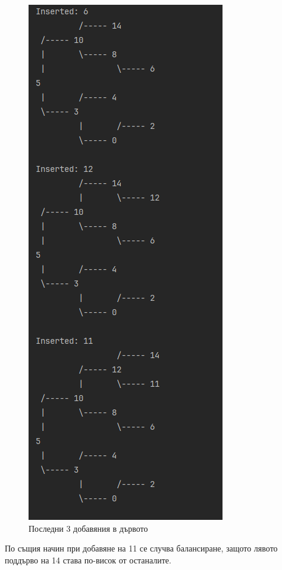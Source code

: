 \documentclass[a4paper,fleqn,12pt]{article}
\begin{document}
\begin{figure}[h!]
	\centering
        \includegraphics[scale=0.7]{images/result3.png}
        \caption{Последни 3 добавяния в дървото}
\end{figure}
\noindent
По същия начин при добавяне на 11 се случва балансиране, защото лявото поддърво на 14 става по-висок от останалите. 
\end{document}
